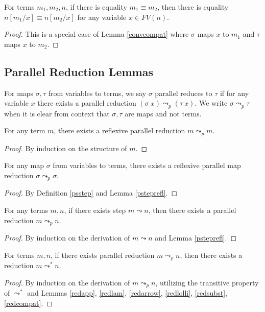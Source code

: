 \documentclass[sigplan,screen,review,anonymous]{acmart}
\newcommand{\step}{\leadsto}
\newcommand{\red}{\leadsto^*}
\newcommand{\pstep}{\leadsto_p}
\begin{document}
\begin{lemma}
  For terms $m_1, m_2, n$, if there is equality $m_1 \equiv m_2$, then there is equality $n[m_1/x] \equiv n[m_2/x]$ for any variable $x \in FV(n)$.
\end{lemma}
\begin{proof}
  This is a special case of Lemma \ref{convcompat} where $\sigma$ maps $x$ to $m_1$ and $\tau$ maps $x$ to $m_2$.
\end{proof}

\subsection{Parallel Reduction Lemmas}

\begin{definition}\label{psstep}
  For maps $\sigma, \tau$ from variables to terms, we say $\sigma$ parallel reduces to $\tau$ if for any variable $x$ there exists a parallel reduction $(\sigma\ x) \pstep (\tau\ x)$. We write $\sigma \pstep \tau$ when it is clear from context that $\sigma, \tau$ are maps and not terms.
\end{definition}

\begin{lemma}\label{psteprefl}
  For any term $m$, there exists a reflexive parallel reduction $m \pstep m$.
\end{lemma}
\begin{proof}
  By induction on the structure of $m$.
\end{proof}

\begin{lemma}
  For any map $\sigma$ from variables to terms, there exists a reflexive parallel map reduction $\sigma \pstep \sigma$.
\end{lemma}
\begin{proof}
  By Definition \ref{psstep} and Lemma \ref{psteprefl}.
\end{proof}

\begin{lemma}\label{steppstep}
  For any terms $m, n$, if there exists step $m \step n$, then there exists a parallel reduction $m \pstep n$.
\end{lemma}
\begin{proof}
  By induction on the derivation of $m \step n$ and Lemma \ref{psteprefl}.
\end{proof}

\begin{lemma}\label{pstepred}
  For terms $m, n$, if there exists parallel reduction $m \pstep n$, then there exists a reduction $m \red n$.
\end{lemma}
\begin{proof}
  By induction on the derivation of $m \pstep n$, utilizing the transitive property of $\red$ and Lemmas \ref{redapp}, \ref{redlam}, \ref{redarrow}, \ref{redlolli}, \ref{redsubst}, \ref{redcompat}.
\end{proof}
\end{document}
